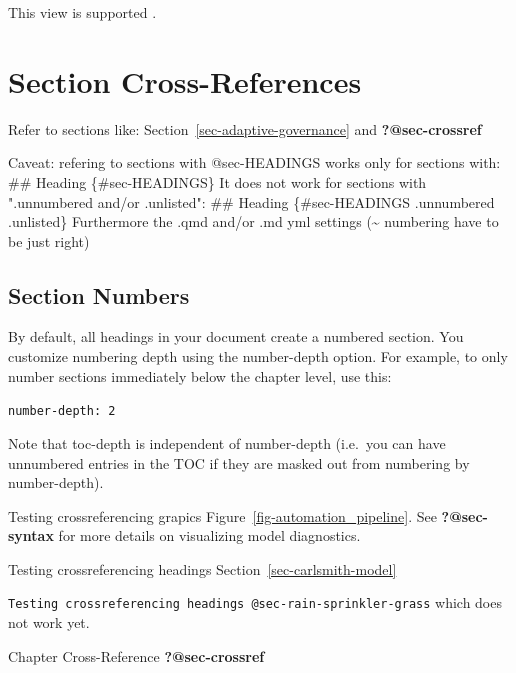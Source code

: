 \documentclass[
  11pt,
  letterpaper,
]{book}
\newenvironment{Shaded}{\begin{snugshade}}{\end{snugshade}}
\newcommand{\AnnotationTok}[1]{\textcolor[rgb]{0.37,0.37,0.37}{#1}}
\newcommand{\CommentTok}[1]{\textcolor[rgb]{0.37,0.37,0.37}{#1}}
\newcommand{\FunctionTok}[1]{\textcolor[rgb]{0.28,0.35,0.67}{#1}}
\newcommand{\NormalTok}[1]{\textcolor[rgb]{0.00,0.23,0.31}{#1}}
\begin{document}
This view is supported \autocites[23]{soares2014}[156-159]{knuth1984}.

\section*{Section Cross-References}\label{sec-crossref}


Refer to sections like: Section~\ref{sec-adaptive-governance} and
\textbf{?@sec-crossref}

\begin{Shaded}
\begin{Highlighting}[]
\AnnotationTok{Caveat:}\CommentTok{ refering to sections with @sec{-}HEADINGS works only for sections with:}
\FunctionTok{\#\# Heading \{\#sec{-}HEADINGS\}}
\NormalTok{It does not work for sections with ".unnumbered and/or .unlisted":}
\FunctionTok{\#\# Heading \{\#sec{-}HEADINGS .unnumbered .unlisted\}}
\NormalTok{Furthermore the .qmd and/or .md yml settings (\textasciitilde{} numbering have to be just right)}
\end{Highlighting}
\end{Shaded}

\subsection*{Section Numbers}\label{section-numbers}

By default, all headings in your document create a numbered section. You
customize numbering depth using the number-depth option. For example, to
only number sections immediately below the chapter level, use this:

\texttt{number-depth:\ 2}

Note that toc-depth is independent of number-depth (i.e.~you can have
unnumbered entries in the TOC if they are masked out from numbering by
number-depth).

Testing crossreferencing grapics Figure~\ref{fig-automation_pipeline}.
See \textbf{?@sec-syntax} for more details on visualizing model
diagnostics.

Testing crossreferencing headings Section~\ref{sec-carlsmith-model}

\texttt{Testing\ crossreferencing\ headings\ @sec-rain-sprinkler-grass}
which does not work yet.

Chapter Cross-Reference \textbf{?@sec-crossref}
\end{document}
